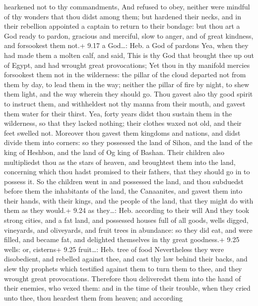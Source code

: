 hearkened not to thy commandments,  And refused to obey,
neither were mindful of thy wonders that thou didst among them; but
hardened their necks, and in their rebellion appointed a captain to
return to their bondage: but thou art a God ready to pardon, gracious
and merciful, slow to anger, and of great kindness, and forsookest them
not.+ 9.17 a God\ldots: Heb. a God of pardons  Yea, when
they had made them a molten calf, and said, This is thy God that brought
thee up out of Egypt, and had wrought great provocations; 
Yet thou in thy manifold mercies forsookest them not in the wilderness:
the pillar of the cloud departed not from them by day, to lead them in
the way; neither the pillar of fire by night, to shew them light, and
the way wherein they should go.  Thou gavest also thy good
spirit to instruct them, and withheldest not thy manna from their mouth,
and gavest them water for their thirst.  Yea, forty years
didst thou sustain them in the wilderness, so that they lacked nothing;
their clothes waxed not old, and their feet swelled not. 
Moreover thou gavest them kingdoms and nations, and didst divide them
into corners: so they possessed the land of Sihon, and the land of the
king of Heshbon, and the land of Og king of Bashan.  Their
children also multipliedst thou as the stars of heaven, and broughtest
them into the land, concerning which thou hadst promised to their
fathers, that they should go in to possess it.  So the
children went in and possessed the land, and thou subduedst before them
the inhabitants of the land, the Canaanites, and gavest them into their
hands, with their kings, and the people of the land, that they might do
with them as they would.+ 9.24 as they\ldots: Heb. according to their
will  And they took strong cities, and a fat land, and
possessed houses full of all goods, wells digged, vineyards, and
oliveyards, and fruit trees in abundance: so they did eat, and were
filled, and became fat, and delighted themselves in thy great goodness.+
9.25 wells: or, cisterns+ 9.25 fruit\ldots: Heb. tree of food
 Nevertheless they were disobedient, and rebelled against
thee, and cast thy law behind their backs, and slew thy prophets which
testified against them to turn them to thee, and they wrought great
provocations.  Therefore thou deliveredst them into the
hand of their enemies, who vexed them: and in the time of their trouble,
when they cried unto thee, thou heardest them from heaven; and according
